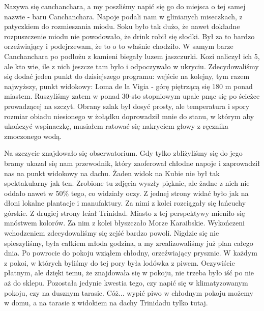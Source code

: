 Nazywa się canchanchara, a my poszliśmy napić się go do miejsca o tej samej nazwie - baru Canchanchara.
Napoje podali nam w glinianych miseczkach, z patyczkiem do rozmieszania miodu.
Soku było tak dużo, że nawet dokładne rozpuszczenie miodu nie powodowało, że drink robił się słodki.
Był za to bardzo orzeźwiający i podejrzewam, że to o to właśnie chodziło.
W samym barze Canchanchara po podłożu z kamieni biegały luzem jaszczurki.
Kozi naliczył ich 5, ale kto wie, ile z nich jeszcze tam było i odpoczywało w ukryciu.
Zdecydowaliśmy się dodać jeden punkt do dzisiejszego programu: wejście na kolejny, tym razem najwyższy, punkt widokowy: Loma de la Vigia - górę piętrzącą się 180 m ponad miastem.
Ruszyliśmy zatem w ponad 30-sto stopniowym upale pnąc się po ścieżce prowadzącej na szczyt.
Obrany szlak był dosyć prosty, ale temperatura i spory rozmiar obiadu niesionego w żołądku doprowadził mnie do stanu, w którym aby ukończyć wspinaczkę, musiałem ratować się nakryciem głowy z ręcznika zmoczonego wodą.
\par Na szczycie znajdowało się obserwatorium.
Gdy tylko zbliżyliśmy się do jego bramy ukazał się nam przewodnik, który zaoferował chłodne napoje i zaprowadził nas na punkt widokowy na dachu.
Żaden widok na Kubie nie był tak spektakularny jak ten.
Zrobione tu zdjęcia wyszły pięknie, ale żadne z nich nie oddało nawet w 50\% tego, co widziały oczy.
Z jednej strony widać było jak na dłoni lokalne plantacje i manufaktury.
Za nimi z kolei rozciągały się łańcuchy górskie.
Z drugiej strony leżał Trinidad.
Miasto z tej perspektywy mieniło się mnóstwem kolorów.
Za nim z kolei błyszczało Morze Karaibskie.
Wykończeni wchodzeniem zdecydowaliśmy się zejść bardzo powoli.
Nigdzie się nie spieszyliśmy, była całkiem młoda godzina, a my zrealizowaliśmy już plan całego dnia.
Po powrocie do pokoju wziąłem chłodny, orzeźwiający prysznic.
W każdym z pokoi, w których byliśmy do tej pory była lodówka z piwem.
Oczywiście płatnym, ale dzięki temu, że znajdowała się w pokoju, nie trzeba było iść po nie aż do sklepu.
Pozostała jedynie kwestia tego, czy napić się w klimatyzowanym pokoju, czy na dusznym tarasie.
Cóż...
wypić piwo w chłodnym pokoju możemy w domu, a na tarasie z widokiem na dachy Trinidadu tylko tutaj.